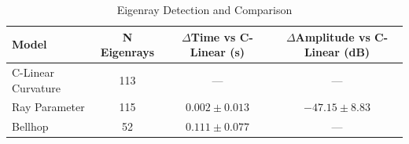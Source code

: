 \begin{table}[h]
\centering
\caption{Eigenray Detection and Comparison}
\begin{tabular}{lccc}
\hline
Model & N Eigenrays & $\Delta$Time vs C-Linear (s) & $\Delta$Amplitude vs C-Linear (dB) \\
\hline
C-Linear Curvature & 113 & --- & --- \\
Ray Parameter & 115 & $0.002 \pm 0.013$ & $-47.15 \pm 8.83$ \\
Bellhop & 52 & $0.111 \pm 0.077$ & --- \\
\hline
\end{tabular}
\end{table}
